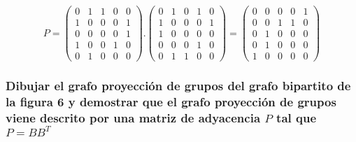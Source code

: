 $$P=\begin{pmatrix}
	0 & 1 & 1 & 0 & 0 \\ 
	1 & 0 & 0 & 0 & 1 \\ 
	0 & 0 & 0 & 0 & 1 \\ 
	1 & 0 & 0 & 1 & 0 \\ 
	0 & 1 & 0 & 0 & 0
\end{pmatrix} . \begin{pmatrix}
0 & 1 & 0 & 1 & 0 \\ 
1 & 0 & 0 & 0 & 1 \\ 
1 & 0 & 0 & 0 & 0 \\ 
0 & 0 & 0 & 1 & 0 \\ 
0 & 1 & 1 & 0 & 0
\end{pmatrix}= \begin{pmatrix}
0 & 0 & 0 & 0 & 1 \\ 
0 & 0 & 1 & 1 & 0 \\ 
0 & 1 & 0 & 0 & 0 \\ 
0 & 1 & 0 & 0 & 0 \\ 
1 & 0 & 0 & 0 & 0
\end{pmatrix} $$ 



\subsubsection{\large Dibujar el grafo proyección de grupos del grafo bipartito de la figura 6 y demostrar que el grafo proyección de grupos viene descrito por una matriz de adyacencia $P$ tal que $P = BB^T$}

\begin {center}
\end{center}


